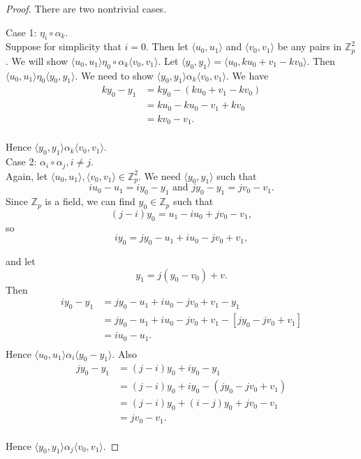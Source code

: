 \documentclass[12pt]{au}
\begin{document}
\begin{proof}
  There are two nontrivial cases.

  Case 1: $\eta_i\circ\alpha_k$.\\

  Suppose for simplicity that $i=0$.  Then let $\langle u_0,u_1\rangle$ and $\langle v_0,v_1\rangle$ be any pairs in $\mathbb{Z}_p^2$.  We will show $\langle u_0,u_1\rangle\eta_0\circ\alpha_k\langle v_0,v_1\rangle$.  Let $\langle y_0,y_1\rangle=\langle u_0,ku_0+v_1-kv_0\rangle$.  Then $\langle u_0,u_1\rangle\eta_0\langle y_0,y_1\rangle$.  We need to show $\langle y_0,y_1\rangle\alpha_k\langle v_0,v_1\rangle$.  We have
  \begin{align*}
     ky_0-y_1 &=ky_0-(ku_0+v_1-kv_0)\\
     &=ku_0-ku_0-v_1+kv_0\\
     &=kv_0-v_1.\\
  \end{align*}

  Hence $\langle y_0,y_1\rangle\alpha_k\langle v_0,v_1\rangle$.\\

  Case 2: $\alpha_i\circ\alpha_j, i\neq j$.\\

  Again, let $\langle u_0,u_1\rangle,\langle v_0,v_1\rangle \in\mathbb{Z}_p^2$.  We need $\langle y_0,y_1\rangle$ such that $$iu_0-u_1=iy_0-y_1 \text{ and }jy_0-y_1=jv_0-v_1.$$  Since $\mathbb{Z}_p$ is a field, we can find $y_0\in\mathbb{Z}_p$ such that $$(j-i)y_0=u_1-iu_0+jv_0-v_1,$$ so $$iy_0=jy_0-u_1+iu_0-jv_0+v_1,$$

  \noindent and let $$y_1=j(y_0-v_0)+v.$$  Then
  \begin{align*}
    iy_0-y_1 &=jy_0-u_1+iu_0-jv_0+v_1-y_1\\
    & =jy_0-u_1+iu_0-jv_0+v_1-[jy_0-jv_0+v_1]\\
    & =iu_0-u_1.\\
  \end{align*}
  Hence $\langle u_0,u_1\rangle\alpha_i\langle y_0-y_1\rangle$.  Also
  \begin{align*}
    jy_0-y_1 &=(j-i)y_0+iy_0-y_1\\
    &= (j-i)y_0+iy_0-(jy_0-jv_0+v_1)\\
    &=(j-i)y_0+(i-j)y_0+jv_0-v_1\\
    &=jv_0-v_1.\\
  \end{align*}

  Hence $\langle y_0,y_1\rangle\alpha_j\langle v_0,v_1\rangle$.

\end{proof}
\end{document}
